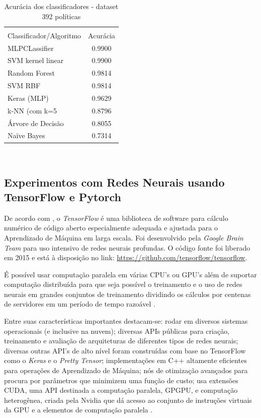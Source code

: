\begin{table}[h]
	\centering
	\caption{Acurácia dos classificadores - dataset 392 políticas}
	\label{tab:acuracias2}
	\vspace{0.3cm}
	\begin{tabular}{p{6cm}c}
		\hline\\
		Classificador/Algoritmo& Acurácia  \\[10pt] 
		\hline
		MLPCLassifier~		   & 0.9900    \\
		SVM kernel linear~     & 0.9900    \\
		Random Forest		   & 0.9814   \\
		SVM RBF                & 0.9814    \\
		Keras (MLP)            & 0.9629    \\
		k-NN (com k=5          & 0.8796    \\
		Árvore de Decisão	   & 0.8055    \\
		Naïve Bayes~		   & 0.7314    \\		
		\hline
	\end{tabular}
	\\[6pt]		
\end{table}

\subsection{Experimentos com Redes Neurais usando TensorFlow e Pytorch}\label{exp:tensorflow-pytorch}
De acordo com , o \textit{TensorFlow} é uma biblioteca de software para cálculo numérico de código aberto especialmente adequada e ajustada para o Aprendizado de Máquina em larga escala. Foi desenvolvido pela \textit{Google Brain Team} para uso intensivo de redes neurais profundas. O código fonte foi liberado em 2015 e está à disposição no link: \url{https://github.com/tensorflow/tensorflow}.

É possível usar computação paralela em várias CPU's ou GPU's além de suportar computação distribuída para que seja possível o treinamento e o uso de redes neurais em grandes conjuntos de treinamento dividindo os cálculos por centenas de servidores em um período de tempo razoável \cite{geron_maos_2020}. 

Entre suas características importantes destacam-se: rodar em diversos sistemas operacionais (e inclusive na nuvem); diversas APIs públicas para criação, treinamento e avaliação de arquiteturas de diferentes tipos de redes neurais; diversas outras API's de alto nível foram construídas com base no TensorFlow como o \textit{Keras} e o \textit{Pretty Tensor}; implementações em C++ altamente eficientes para operações de Aprendizado de Máquina; nós de otimização avançados para procura por parâmetros que minimizem uma função de custo; usa extensões CUDA, uma  API destinada a computação paralela, GPGPU, e computação heterogênea, criada pela Nvidia que dá acesso ao conjunto de instruções virtuais da GPU e a elementos de computação paralela \cite{geron_maos_2020}.

